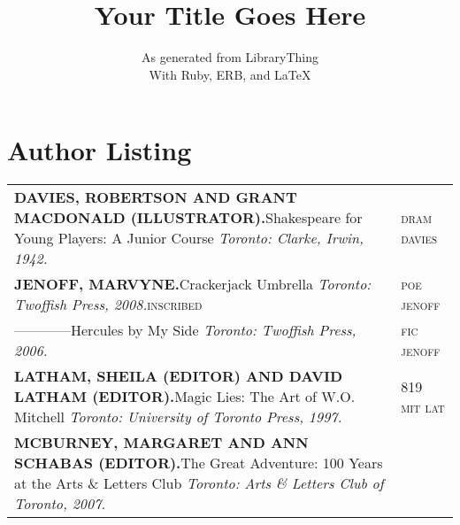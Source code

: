 \documentclass[10pt]{article}
\title{Your Title Goes Here}
\author{As generated from LibraryThing\\With Ruby, ERB, and \LaTeX}
\date{} %
\begin{document}
\maketitle

\section*{Author Listing}

\begin{longtable}{p{} l}


{\MakeUppercase{\textsf{\textbf{\textbf{Davies, Robertson} and \textbf{Grant MacDonald} (Illustrator).}}}}\hspace{2em}Shakespeare for Young Players: A Junior Course
\newline
\textit{Toronto: Clarke, Irwin, 1942.}\newline
&

\MakeLowercase{\textsc{DRAM DAVIES}} \\


{\MakeUppercase{\textsf{\textbf{\textbf{Jenoff, Marvyne}.}}}}\hspace{2em}Crackerjack Umbrella
\newline
\textit{Toronto: Twoffish Press, 2008.}\newline\textsc{inscribed}\newline
&

\MakeLowercase{\textsc{POE JENOFF}} \\


------------\hspace{2em}Hercules by My Side
\newline
\textit{Toronto: Twoffish Press, 2006.}\newline
&

\MakeLowercase{\textsc{FIC JENOFF}} \\


{\MakeUppercase{\textsf{\textbf{\textbf{Latham, Sheila} (Editor) and \textbf{David Latham} (Editor).}}}}\hspace{2em}Magic Lies: The Art of W.O. Mitchell
\newline
\textit{Toronto: University of Toronto Press, 1997.}\newline
&

\MakeLowercase{\textsc{819 MIT LAT}} \\


{\MakeUppercase{\textsf{\textbf{\textbf{McBurney, Margaret} and \textbf{Ann Schabas} (Editor).}}}}\hspace{2em}The Great Adventure: 100 Years at the Arts \& Letters Club
\newline
\textit{Toronto: Arts \& Letters Club of Toronto, 2007.}\newline
&


\end{longtable}
\end{document}
